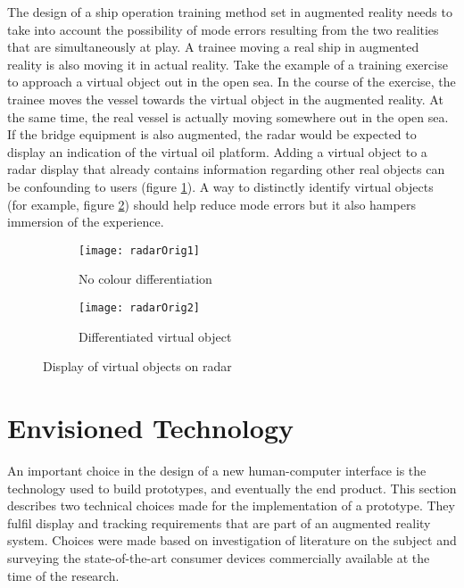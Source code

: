 The design of a ship operation training method set in augmented reality needs to take into account the possibility of mode errors resulting from the two realities that are simultaneously at play. A trainee moving a real ship in augmented reality is also moving it in actual reality. Take the example of a training exercise to approach a virtual object out in the open sea. In the course of the exercise, the trainee moves the vessel towards the virtual object in the augmented reality. At the same time, the real vessel is actually moving somewhere out in the open sea. If the bridge equipment is also augmented, the radar would be expected to display an indication of the virtual oil platform. Adding a virtual object to a radar display that already contains information regarding other real objects can be confounding to users (figure \ref{fig:nocolour}). A way to distinctly identify virtual objects (for example, figure \ref{fig:diffcolour}) should help reduce mode errors but it also hampers immersion of the experience. 

\begin{figure}
    \centering
    \begin{subfigure}[b]{0.45\textwidth}
        \centering
        \texttt{[image: radarOrig1]}
        \caption{No colour differentiation}
        \label{fig:nocolour}
    \end{subfigure}
    \hfill
    \begin{subfigure}[b]{0.45\textwidth}
        \centering
        \texttt{[image: radarOrig2]}
        \caption{Differentiated virtual object}
        \label{fig:diffcolour}
    \end{subfigure}
    \caption{Display of virtual objects on radar}
    \label{fig:threegraphs}
\end{figure}

\section{Envisioned Technology}
\label{sec:envisionedtech}
An important choice in the design of a new human-computer interface is the technology used to build prototypes, and eventually the end product. This section describes two technical choices made for the implementation of a prototype. They fulfil display and tracking requirements that are part of an augmented reality system. Choices were made based on investigation of literature on the subject and surveying the state-of-the-art consumer devices commercially available at the time of the research.

